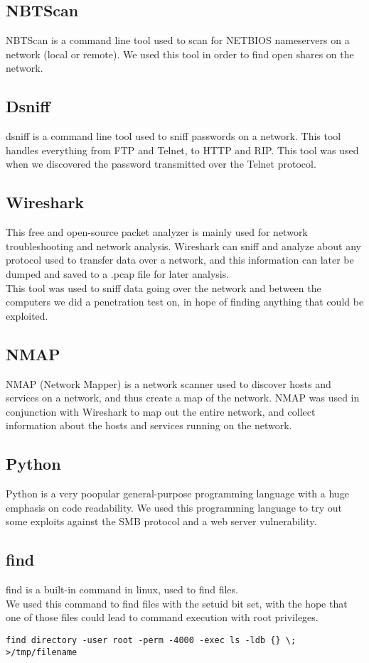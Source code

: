     \subsection*{NBTScan}
    NBTScan is a command line tool used to scan for NETBIOS nameservers on a network (local or remote). We used this tool in order to find open shares on the network.
     
    \subsection*{Dsniff}
    dsniff is a command line tool used to sniff passwords on a network. This tool handles everything from FTP and Telnet, to HTTP and RIP. This tool was used when we discovered the password transmitted over the Telnet protocol.
     
    \subsection*{Wireshark}
    This free and open-source packet analyzer is mainly used for network troubleshooting and network analysis. Wireshark can sniff and analyze about any protocol used to transfer data over a network, and this information can later be dumped and saved to a .pcap file for later analysis.\\
    This tool was used to sniff data going over the network and between the computers we did a penetration test on, in hope of finding anything that could be exploited.
     
    \subsection*{NMAP}
    NMAP (Network Mapper) is a network scanner used to discover hosts and services on a network, and thus create a map of the network. NMAP was used in conjunction with Wireshark to map out the entire network, and collect information about the hosts and services running on the network.
     
    \subsection*{Python}
    Python is a very poopular general-purpose programming language with a huge emphasis on code readability. We used this programming language to try out some exploits against the SMB protocol and a web server vulnerability.
     
    \subsection*{find}
    find is a built-in command in linux, used to find files.\\
    We used this command to find files with the setuid bit set, with the hope that one of those files could lead to command execution with root privileges.\\
   \vspace{-0.5cm}\begin{lstlisting}
find directory -user root -perm -4000 -exec ls -ldb {} \; >/tmp/filename
\end{lstlisting}

